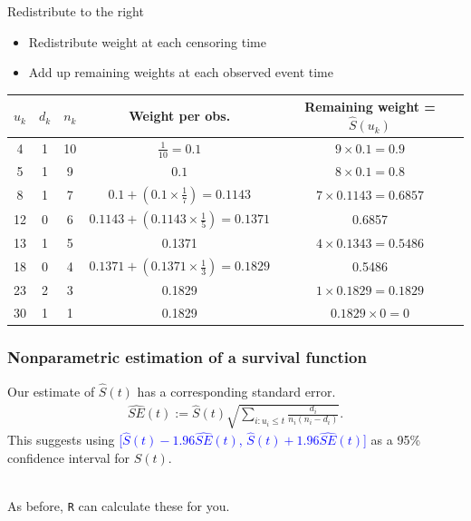 \documentclass[10pt,t]{beamer}
\begin{document}
\begin{frame}{Redistribute to the right}
\begin{itemize}
	\item Redistribute weight at each censoring time
	\item Add up remaining weights at each observed event time
\end{itemize}
		\begin{footnotesize}
		\begin{tabular}{|c|c|c|c|c|}
			\hline
				$u_k$ & $d_k$ & $n_k$ & Weight per obs. & Remaining weight = $\widehat{S}(u_k)$ \\
			\hline
			4 & 1 & 10 & $\frac{1}{10} = 0.1$ & $9\times 0.1= 0.9$\\
			5 & 1 & 9 & $0.1$ &  $8\times 0.1= 0.8$  \\
			8 & 1 & 7 & $0.1 + (0.1\times \frac{1}{7}) = 0.1143$ & $7 \times 0.1143 = 0.6857$\\
			12 & 0 & 6 & $0.1143 +  (0.1143\times\frac{1}{5}) = 0.1371$ &  0.6857\\
			13 & 1 & 5 & 0.1371 & $4 \times 0.1343 =0.5486 $\\
			18 & 0 & 4 & $0.1371 + (0.1371\times \frac{1}{3}) = 0.1829$ & 0.5486\\
			23 & 2 & 3 & 0.1829&  $1 \times 0.1829 = 0.1829$\\
			30 & 1 & 1 & 0.1829 & $0.1829 \times 0 = 0$\\
			\hline
		\end{tabular}
	\end{footnotesize}
\end{frame}

\begin{frame}
\frametitle{Nonparametric estimation of a survival function}

Our estimate of $\widehat{S}(t)$ has a corresponding standard error. 
\begin{align*}
\widehat{SE}(t) := \widehat{S}(t)\sqrt{\sum_{i : u_i \leq t}\frac{d_i}{n_i(n_i - d_i)}}.
\end{align*}
This suggests using 
\textcolor{blue}{[$\widehat{S}(t) - 1.96 \widehat{SE}(t)$, $\widehat{S}(t) + 1.96 \widehat{SE}(t)$]} as a 95\% confidence interval for $S(t)$.
\\ ~\ 

As before, \texttt{R} can calculate these for you.
\end{frame}
\end{document}
